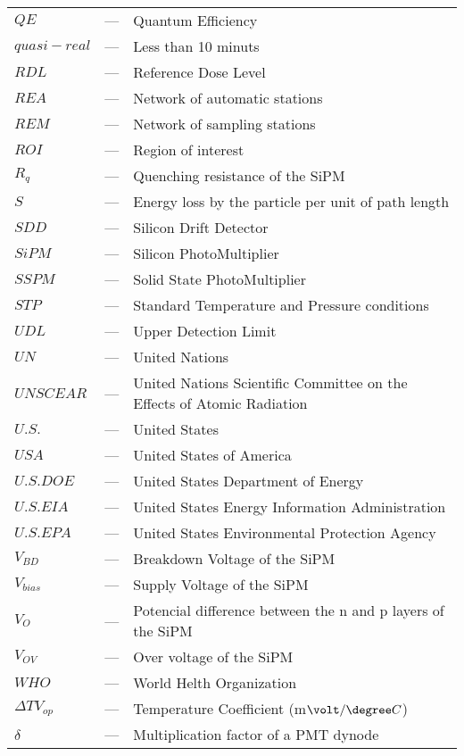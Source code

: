\begin{longtable}{p{25mm} c p{120mm} }
$QE$ & --- & Quantum Efficiency\\
$quasi-real$ & --- & Less than 10 minuts\\
$RDL$ & --- & Reference Dose Level\\
$REA$ & --- & Network of automatic stations\\
$REM$ & --- & Network of sampling stations\\
$ROI$ & --- & Region of interest\\
$R_q$ & --- & Quenching resistance of the SiPM\\
$S$ & --- & Energy loss by the particle per unit of path length\\
$SDD$ & --- & Silicon Drift Detector\\
$SiPM$ & --- & Silicon PhotoMultiplier\\
$SSPM$ & --- & Solid State PhotoMultiplier\\
$STP$ & --- & Standard Temperature and Pressure conditions\\
$UDL$ & --- & Upper Detection Limit\\
$UN$ & --- & United Nations\\
$UNSCEAR$ & --- & United Nations Scientific Committee on the Effects
\newline
of Atomic Radiation\\
$U.S.$ & --- & United States\\
$USA$ & --- & United States of America\\
$U.S. DOE$ & --- & United States Department of Energy\\
$U.S. EIA$ & --- & United States Energy Information Administration\\
$U.S. EPA$ & --- & United States Environmental Protection Agency\\
$V_{BD}$ & --- & Breakdown Voltage of the SiPM\\
$V_{bias}$ & --- & Supply Voltage of the SiPM\\
$V_{O}$ & --- & Potencial difference between the n and p layers of 
\newline
the SiPM\\
$V_{OV}$ & --- & Over voltage of the SiPM\\
$WHO$ & --- & World Helth Organization\\
$\Delta TV_{op}$ & --- & Temperature Coefficient (m$\volt/\degree C$)\\
$\delta$ & --- & Multiplication factor of a PMT dynode\\


\end{longtable}
